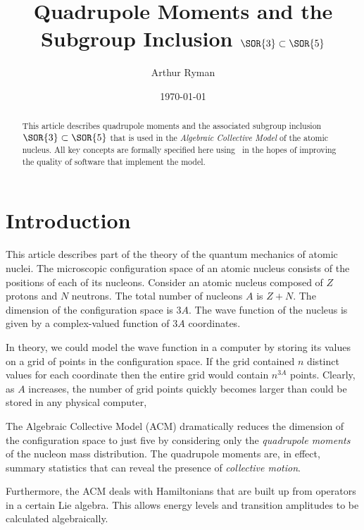 \documentclass{amsart}
\begin{document}
\title{Quadrupole Moments and the Subgroup Inclusion $\SOR{3} \subset \SOR{5}$}
\author{Arthur Ryman}
\date{\today}

\begin{abstract}
This article describes quadrupole moments and the associated subgroup inclusion $\SOR{3} \subset \SOR{5}$
that is used in the \textit{Algebraic Collective Model} of the atomic nucleus.
All key concepts are formally specified here using \ZN\ in the hopes of improving the quality of software that
implement the model.
\end{abstract}

\maketitle

\tableofcontents

\section{Introduction}

This article describes part of the theory of the quantum mechanics of atomic nuclei.
The microscopic configuration space of an atomic nucleus consists of the positions of each of its nucleons.
Consider an atomic nucleus composed of $Z$ protons and $N$ neutrons.
The total number of nucleons $A$ is $Z + N$.
The dimension of the configuration space is $3A$.
The wave function of the nucleus is given by a complex-valued function of $3A$ coordinates.

In theory, we could model the wave function in a computer by storing its values on a grid of points in the configuration space.
If the grid contained $n$ distinct values for each coordinate then the entire grid would contain $n^{3A}$ points.
Clearly, as $A$ increases, the number of grid points quickly becomes larger than could be stored in any physical computer,

The Algebraic Collective Model (ACM) dramatically reduces the dimension of the configuration space to
just five by considering only the \textit{quadrupole moments} of the nucleon mass distribution.
The quadrupole moments are, in effect, summary statistics that can reveal the presence of \textit{collective motion}.

Furthermore, the ACM deals with Hamiltonians that are built up from operators in a certain Lie algebra.
This allows energy levels and transition amplitudes to be calculated algebraically.
\end{document}
